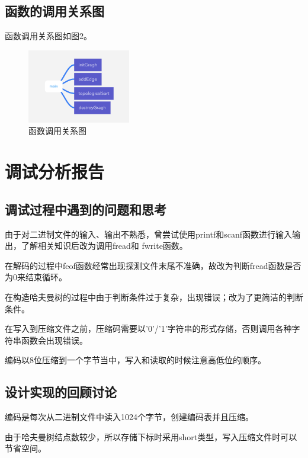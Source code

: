 \documentclass{article}
\begin{document}
\subsection{函数的调用关系图}

函数调用关系图如图2。

\begin{figure}[htbp]

    \centering\includegraphics[width=0.4\textwidth]{./Images/pic5_2.png}

    \caption{函数调用关系图}

\end{figure}

\section{调试分析报告}

\subsection{调试过程中遇到的问题和思考}

由于对二进制文件的输入、输出不熟悉，曾尝试使用printf和scanf函数进行输入输出，了解相关知识后改为调用fread和
fwrite函数。

在解码的过程中feof函数经常出现探测文件末尾不准确，故改为判断fread函数是否为0来结束循环。

在构造哈夫曼树的过程中由于判断条件过于复杂，出现错误；改为了更简洁的判断条件。

在写入到压缩文件之前，压缩码需要以'0'/'1'字符串的形式存储，否则调用各种字符串函数会出现错误。

编码以8位压缩到一个字节当中，写入和读取的时候注意高低位的顺序。

\subsection{设计实现的回顾讨论}

编码是每次从二进制文件中读入1024个字节，创建编码表并且压缩。

由于哈夫曼树结点数较少，所以存储下标时采用short类型，写入压缩文件时可以节省空间。
\end{document}
